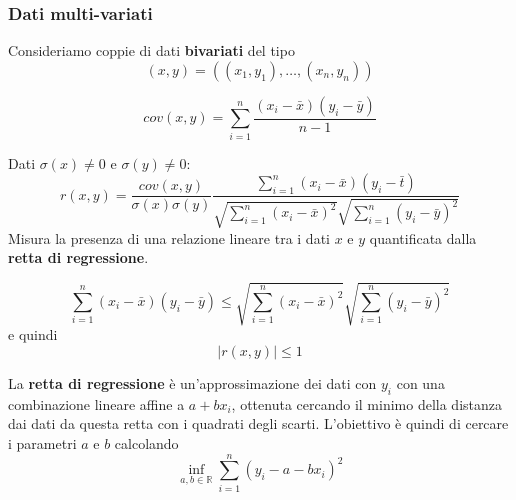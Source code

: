 \subsubsection{Dati multi-variati}
Consideriamo coppie di dati \textbf{bivariati} del tipo
\begin{equation*}
	(x,y) = ((x_1,y_1), \ldots, (x_n,y_n))
\end{equation*}
\begin{definition}
	\begin{equation}
		cov(x,y) = \sum_{i=1}^{n} \frac{(x_i - \bar{x})(y_i - \bar{y})}{n-1}
	\end{equation}
\end{definition}
\begin{definition}
	Dati $\sigma(x) \neq 0$ e $\sigma(y) \neq 0$:
	\begin{equation}
		r(x,y) = \frac{cov(x,y)}{\sigma(x)\sigma(y)}  \frac{\sum_{i=1}^{n}(x_i-\bar{x})(y_i-\bar{t})}{\sqrt{\sum_{i=1}^{n}(x_i - \bar{x})^2}\sqrt{\sum_{i=1}^{n}(y_i - \bar{y})^2}}
	\end{equation}
	Misura la presenza di una relazione lineare tra i dati $x$ e $y$ quantificata dalla \textbf{retta di regressione}.
\end{definition}
\begin{proposition}
	\begin{equation}
		\sum_{i=1}^{n}(x_i - \bar{x})(y_i - \bar{y}) \leq \sqrt{\sum_{i=1}^{n}(x_i - \bar{x})^2}\sqrt{\sum_{i=1}^{n}(y_i - \bar{y})^2}
	\end{equation}
	e quindi
	\begin{equation}
		\lvert r(x,y)\rvert \leq 1
	\end{equation}
\end{proposition}

La \textbf{retta di regressione} è un'approssimazione dei dati con $y_i$ con una combinazione lineare affine a $a + bx_i$, ottenuta cercando il minimo della distanza dai dati da questa retta con i quadrati degli scarti. L'obiettivo è quindi di cercare i parametri $a$ e $b$ calcolando
\begin{equation}
	\label{eq:regr}
	\inf_{a,b \in \mathbb{R}} \sum_{i=1}^{n}(y_i-a-bx_i)^2
\end{equation}

